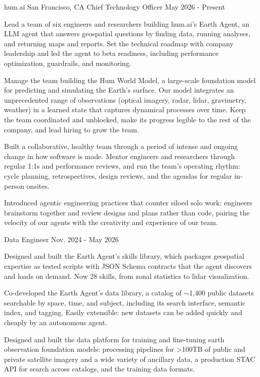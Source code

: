 \documentclass[11pt, a4paper]{awesome-cv}
\begin{document}
\begin{cventries}

  \cventrydouble
    {hum.ai}
    {San Francisco, CA}
    {Chief Technology Officer}
    {May 2026 - Present}
    {
    \begin{cvitems}
      \item Lead a team of six engineers and researchers building hum.ai's Earth Agent, an LLM agent that answers geospatial questions by finding data, running analyses, and returning maps and reports. Set the technical roadmap with company leadership and led the agent to beta readiness, including performance optimization, guardrails, and monitoring.
      \item Manage the team building the Hum World Model, a large-scale foundation model for predicting and simulating the Earth's surface. Our model integrates an unprecedented range of observations (optical imagery, radar, lidar, gravimetry, weather) in a learned state that captures dynamical processes over time. Keep the team coordinated and unblocked, make its progress legible to the rest of the company, and lead hiring to grow the team.
      \item Built a collaborative, healthy team through a period of intense and ongoing change in how software is made. Mentor engineers and researchers through regular 1:1s and performance reviews, and run the team's operating rhythm: cycle planning, retrospectives, design reviews, and the agendas for regular in-person onsites.
      \item Introduced agentic engineering practices that counter siloed solo work: engineers brainstorm together and review designs and plans rather than code, pairing the velocity of our agents with the creativity and experience of our team.
    \end{cvitems}
    }
    {Data Engineer}
    {Nov. 2024 - May 2026}
    {
    \begin{cvitems}
      \item Designed and built the Earth Agent's skills library, which packages geospatial expertise as tested scripts with JSON Schema contracts that the agent discovers and loads on demand. Now 28 skills, from zonal statistics to lidar visualization.
      \item Co-developed the Earth Agent's data library, a catalog of $\sim$1,400 public datasets searchable by space, time, and subject, including its search interface, semantic index, and tagging. Easily extensible: new datasets can be added quickly and cheaply by an autonomous agent.
      \item Designed and built the data platform for training and fine-tuning earth observation foundation models: processing pipelines for >100TB of public and private satellite imagery and a wide variety of ancillary data, a production STAC API for search across catalogs, and the training data formats.
    \end{cvitems}
    }


\end{cventries}
\end{document}

